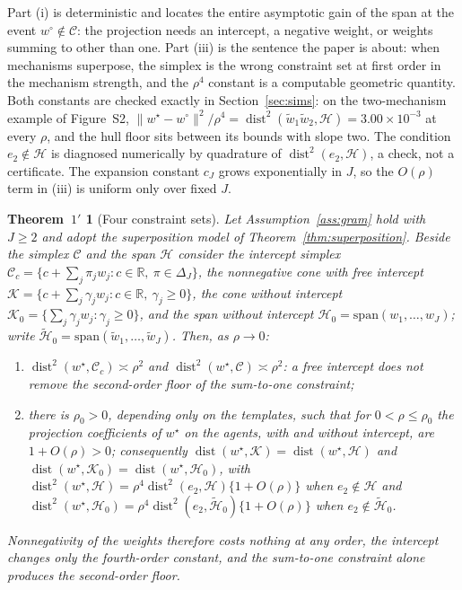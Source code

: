 \documentclass[12pt]{article}
\newcommand{\R}{\mathbb{R}}
\newcommand{\calH}{\mathcal{H}}
\newcommand{\calC}{\mathcal{C}}
\newcommand{\calK}{\mathcal{K}}
\newcommand{\dist}{\operatorname{dist}}
\newcommand{\norm}[1]{\|#1\|}
\newcommand{\wstar}{w^{\star}}
\newcommand{\wproj}{w^{\circ}}
\newtheorem*{thmprime}{Theorem~$1'$}
\begin{document}
Part (i) is deterministic and locates the entire asymptotic gain of the span at the event $\wproj\notin\calC$: the projection needs an intercept, a negative weight, or weights summing to other than one. Part (iii) is the sentence the paper is about: when mechanisms superpose, the simplex is the wrong constraint set at first order in the mechanism strength, and the $\rho^4$ constant is a computable geometric quantity. Both constants are checked exactly in Section~\ref{sec:sims}: on the two-mechanism example of Figure~S2, $\norm{\wstar-\wproj}^2/\rho^4=\dist^2(\tilde w_1\tilde w_2,\calH)=3.00\times10^{-3}$ at every $\rho$, and the hull floor sits between its bounds with slope two. The condition $e_2\notin\calH$ is diagnosed numerically by quadrature of $\dist^2(e_2,\calH)$, a check, not a certificate. The expansion constant $c_J$ grows exponentially in $J$, so the $O(\rho)$ term in (iii) is uniform only over fixed $J$.

\begin{thmprime}[Four constraint sets]
Let Assumption~\ref{ass:gram} hold with $J\ge2$ and adopt the superposition model of Theorem~\ref{thm:superposition}. Beside the simplex $\calC$ and the span $\calH$ consider the intercept simplex $\calC_c=\{c+\sum_j\pi_jw_j:c\in\R,\ \pi\in\Delta_J\}$, the nonnegative cone with free intercept $\calK=\{c+\sum_j\gamma_jw_j:c\in\R,\ \gamma_j\ge0\}$, the cone without intercept $\calK_0=\{\sum_j\gamma_jw_j:\gamma_j\ge0\}$, and the span without intercept $\calH_0=\mathrm{span}(w_1,\dots,w_J)$; write $\tilde{\calH}_0=\mathrm{span}(\tilde w_1,\dots,\tilde w_J)$. Then, as $\rho\to0$:
\begin{enumerate}
\item[(i)] $\dist^2(\wstar,\calC_c)\asymp\rho^2$ and $\dist^2(\wstar,\calC)\asymp\rho^2$: a free intercept does not remove the second-order floor of the sum-to-one constraint;
\item[(ii)] there is $\rho_0>0$, depending only on the templates, such that for $0<\rho\le\rho_0$ the projection coefficients of $\wstar$ on the agents, with and without intercept, are $1+O(\rho)>0$; consequently $\dist(\wstar,\calK)=\dist(\wstar,\calH)$ and $\dist(\wstar,\calK_0)=\dist(\wstar,\calH_0)$, with $\dist^2(\wstar,\calH)=\rho^4\dist^2(e_2,\calH)\{1+O(\rho)\}$ when $e_2\notin\calH$ and $\dist^2(\wstar,\calH_0)=\rho^4\dist^2(e_2,\tilde{\calH}_0)\{1+O(\rho)\}$ when $e_2\notin\tilde{\calH}_0$.
\end{enumerate}
Nonnegativity of the weights therefore costs nothing at any order, the intercept changes only the fourth-order constant, and the sum-to-one constraint alone produces the second-order floor.
\end{thmprime}
\end{document}
